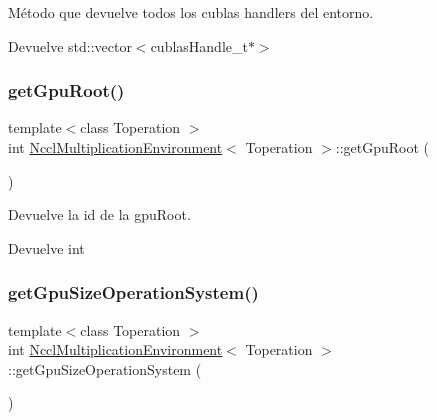 Método que devuelve todos los cublas handlers del entorno. 

\begin{DoxyReturn}{Devuelve}
std\+::vector$<$cublas\+Handle\+\_\+t$\ast$$>$ 
\end{DoxyReturn}
\mbox{\label{classNcclMultiplicationEnvironment_ab5303dd2bad43af17af76de714c6a9cb}} 
\subsubsection{\texorpdfstring{get\+Gpu\+Root()}{getGpuRoot()}}
{\footnotesize\ttfamily template$<$class Toperation $>$ \\
int \hyperlink{classNcclMultiplicationEnvironment}{Nccl\+Multiplication\+Environment}$<$ Toperation $>$\+::get\+Gpu\+Root (\begin{DoxyParamCaption}{ }\end{DoxyParamCaption})}



Devuelve la id de la gpu\+Root. 

\begin{DoxyReturn}{Devuelve}
int 
\end{DoxyReturn}
\mbox{\label{classNcclMultiplicationEnvironment_a752d9bce3f46c935ccec9ffd964aa18c}} 
\subsubsection{\texorpdfstring{get\+Gpu\+Size\+Operation\+System()}{getGpuSizeOperationSystem()}}
{\footnotesize\ttfamily template$<$class Toperation $>$ \\
int \hyperlink{classNcclMultiplicationEnvironment}{Nccl\+Multiplication\+Environment}$<$ Toperation $>$\+::get\+Gpu\+Size\+Operation\+System (\begin{DoxyParamCaption}{ }\end{DoxyParamCaption})}



